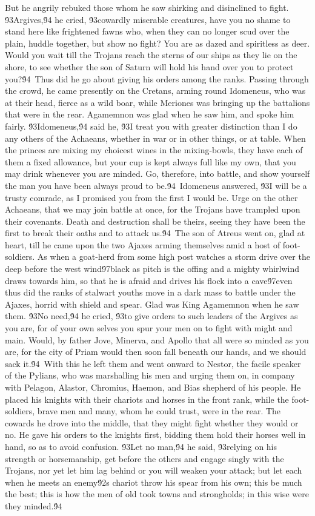 {But he angrily rebuked those whom he saw shirking and disinclined to fight. \'93Argives,\'94 he cried, \'93cowardly miserable creatures, have you no shame to stand here like frightened fawns who, when they can no longer scud over the plain, huddle together, but show no fight? You are as dazed and spiritless as deer. Would you wait till the Trojans reach the sterns of our ships as they lie on the shore, to see whether the son of Saturn will hold his hand over you to protect you?\'94\
Thus did he go about giving his orders among the ranks. Passing through the crowd, he came presently on the Cretans, arming round Idomeneus, who was at their head, fierce as a wild boar, while Meriones was bringing up the battalions that were in the rear. Agamemnon was glad when he saw him, and spoke him fairly. \'93Idomeneus,\'94 said he, \'93I treat you with greater distinction than I do any others of the Achaeans, whether in war or in other things, or at table. When the princes are mixing my choicest wines in the mixing-bowls, they have each of them a fixed allowance, but your cup is kept always full like my own, that you may drink whenever you are minded. Go, therefore, into battle, and show yourself the man you have been always proud to be.\'94\
Idomeneus answered, \'93I will be a trusty comrade, as I promised you from the first I would be. Urge on the other Achaeans, that we may join battle at once, for the Trojans have trampled upon their covenants. Death and destruction shall be theirs, seeing they have been the first to break their oaths and to attack us.\'94\
The son of Atreus went on, glad at heart, till he came upon the two Ajaxes arming themselves amid a host of foot-soldiers. As when a goat-herd from some high post watches a storm drive over the deep before the west wind\'97black as pitch is the offing and a mighty whirlwind draws towards him, so that he is afraid and drives his flock into a cave\'97even thus did the ranks of stalwart youths move in a dark mass to battle under the Ajaxes, horrid with shield and spear. Glad was King Agamemnon when he saw them. \'93No need,\'94 he cried, \'93to give orders to such leaders of the Argives as you are, for of your own selves you spur your men on to fight with might and main. Would, by father Jove, Minerva, and Apollo that all were so minded as you are, for the city of Priam would then soon fall beneath our hands, and we should sack it.\'94\
With this he left them and went onward to Nestor, the facile speaker of the Pylians, who was marshalling his men and urging them on, in company with Pelagon, Alastor, Chromius, Haemon, and Bias shepherd of his people. He placed his knights with their chariots and horses in the front rank, while the foot-soldiers, brave men and many, whom he could trust, were in the rear. The cowards he drove into the middle, that they might fight whether they would or no. He gave his orders to the knights first, bidding them hold their horses well in hand, so as to avoid confusion. \'93Let no man,\'94 he said, \'93relying on his strength or horsemanship, get before the others and engage singly with the Trojans, nor yet let him lag behind or you will weaken your attack; but let each when he meets an enemy\'92s chariot throw his spear from his own; this be much the best; this is how the men of old took towns and strongholds; in this wise were they minded.\'94\
}
